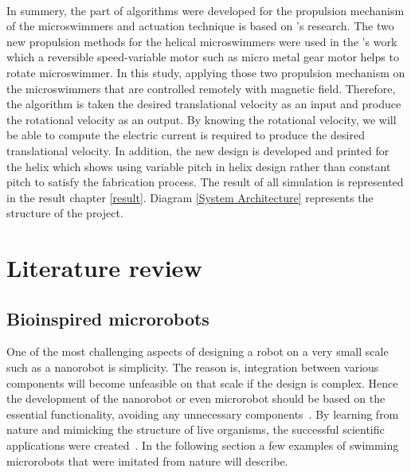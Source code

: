 \documentclass[12pt,a4paper,titlepage]{report}
\begin{document}
\paragraph{}
In summery, the part of algorithms were developed for the propulsion mechanism of the microswimmers
and actuation technique is based on \citeauthor{mahoney2011velocity}\rq{}s research. The two new 
propulsion methods for the helical microswimmers were used in the \citeauthor{rodenborn2013propulsion}\rq{}s
work which a reversible speed-variable motor such as micro metal gear motor helps to rotate 
microswimmer. In this study, applying those two propulsion mechanism on the microswimmers that 
are controlled remotely with magnetic field. Therefore, the algorithm is taken the desired translational
velocity as an input and produce the rotational velocity as an output. By knowing the rotational velocity, 
we will be able to compute the electric current is required to produce the desired translational velocity. 
In addition, the new design is developed and printed for the helix which shows using variable pitch
 in helix design rather than constant pitch to satisfy the fabrication process. The result of all simulation is
represented in the result chapter \ref{result}. Diagram \ref{System Architecture} represents
 the structure of the project.












\section{Literature review}
 


\subsection{Bioinspired microrobots}

One of the most challenging aspects of designing a robot on a very small scale such 
as a nanorobot is simplicity. The reason is, integration between various components
will become unfeasible on that
 scale if the design is complex. Hence the development of the nanorobot or even microrobot
 should be based on the essential functionality, avoiding any unnecessary components~\citep{gao2013bioinspired}.
By learning from nature and mimicking the structure of live organisms, the successful  
scientific applications were created~\citep{qiunanohelices}. In the following section a
 few examples of swimming microrobots that were imitated from nature will describe. 
 
\end{document}
